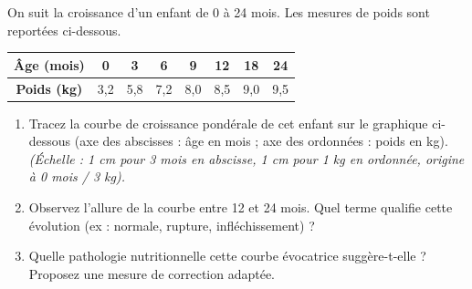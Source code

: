 \documentclass[11pt]{article}
\begin{document}
\begin{exercice}
On suit la croissance d'un enfant de 0 à 24 mois. Les mesures de poids sont reportées ci-dessous.
\begin{center}
\begin{tabular}{|c|c|c|c|c|c|c|c|}
\hline
\textbf{Âge (mois)} & 0 & 3 & 6 & 9 & 12 & 18 & 24 \\
\hline
\textbf{Poids (kg)} & 3,2 & 5,8 & 7,2 & 8,0 & 8,5 & 9,0 & 9,5 \\
\hline
\end{tabular}
\end{center}
\begin{enumerate}
\item Tracez la courbe de croissance pondérale de cet enfant sur le graphique ci-dessous (axe des abscisses : âge en mois ; axe des ordonnées : poids en kg). \textit{(Échelle : 1 cm pour 3 mois en abscisse, 1 cm pour 1 kg en ordonnée, origine à 0 mois / 3 kg).}
\item Observez l'allure de la courbe entre 12 et 24 mois. Quel terme qualifie cette évolution (ex : normale, rupture, infléchissement) ?
\item Quelle pathologie nutritionnelle cette courbe évocatrice suggère-t-elle ? Proposez une mesure de correction adaptée.
\end{enumerate}
\end{exercice}
\end{document}
